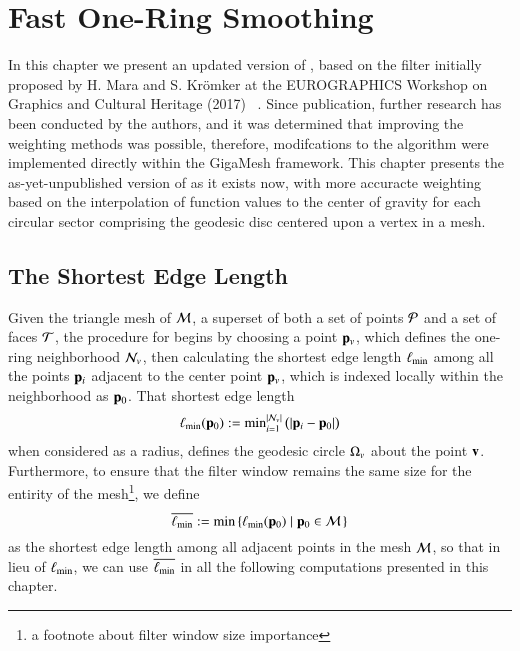 \chapter{Fast One-Ring Smoothing}
\label{ch4}
In this chapter we present an updated version of , based on the filter initially proposed by H. Mara and S. Krömker at the EUROGRAPHICS Workshop on Graphics and Cultural Heritage (2017) ~\cite[s.~3.2]{Mara17}. Since publication, further research has been conducted by the authors, and it was determined that improving the weighting methods was possible, therefore, modifcations to the algorithm were implemented directly within the GigaMesh  framework. This chapter presents the as-yet-unpublished version of  as it exists now, with more accuracte weighting based on the interpolation of function values to the center of gravity for each circular sector comprising the geodesic disc centered upon a vertex in a mesh.

%
%
%
%
\section{The Shortest Edge Length}
\label{ch4sSEL}
Given the triangle mesh of \tdd{} $\mathcal{M}$, a superset of both a set of points $\mathcal{P}$ and a set of faces $\mathcal{T}$, the procedure for   begins by choosing a point $\mathbf{p}_v$, which defines the one-ring neighborhood $\mathcal{N}_v$, then calculating the shortest edge length $\ell_\text{min}$ among all the points $\mathbf{p}_i$ adjacent to the center point $\mathbf{p}_v$, which  is indexed locally within the neighborhood as $\mathbf{p}_0$. That shortest edge length
%
\begin{equation}
	\ell_\text{min}(\mathbf{p}_0) := \text{min}^{|\mathcal{N}_v|}_{i=1}\,\big(|\mathbf{p}_i - \mathbf{p}_0|\big)
	\label{eq:localMinimumEdgeLength}
\end{equation}%
%
%
%
when considered as a radius, defines the geodesic circle $\Omega_v$ about the point $\mathbf{v}$. Furthermore, to ensure that the filter window remains the same size for the entirity of the mesh\footnote{a footnote about filter window size importance}, we define
%
\begin{equation}
	\overline{\ell_\text{min}} := \min\left \{\ell_\text{min}(\mathbf{p}_0) \;|\; \mathbf{p}_0 \in \mathcal{M}\,\right \}
	\label{eq:globalMinimumEdgeLength}
\end{equation}%
%
%
as the shortest edge length among all adjacent points in the mesh $\mathcal{M}$, so that in lieu of $\ell_\text{min}$, we can use $\overline{\ell_\text{min}}$ in all the following computations presented in this chapter.

